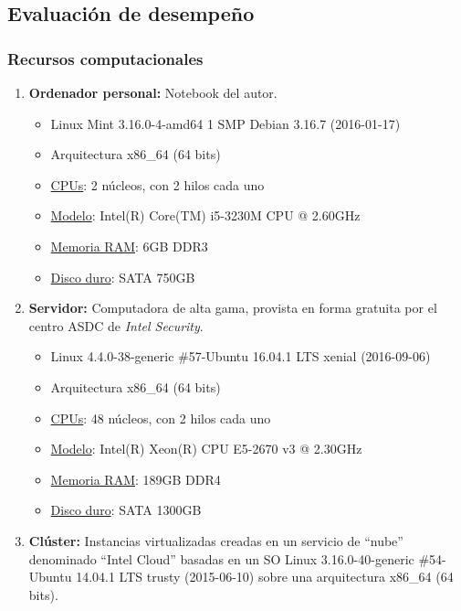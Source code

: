 \subsection{Evaluación de desempeño}
\begin{frame}[t,fragile]
	\frametitle {Recursos computacionales}

	
	\begin{enumerate}
		\item<1|only@1> \textbf{Ordenador personal:} Notebook del autor.
		
		\begin{itemize}
			\item Linux Mint 3.16.0-4-amd64 1 SMP Debian 3.16.7 (2016-01-17)
			\item Arquitectura x86\_64 (64 bits)
			\item \underline{CPUs}: 2 núcleos, con 2 hilos cada uno
			\item \underline{Modelo}: Intel(R) Core(TM) i5-3230M CPU @ 2.60GHz
			\item \underline{Memoria RAM}: 6GB DDR3
			\item \underline{Disco duro}: SATA 750GB %
		\end{itemize}
		
		\item<2|only@2> \textbf{Servidor:} Computadora de alta gama, provista en forma gratuita por el centro ASDC de \textit{Intel Security}.
		
		\begin{itemize}
			\item Linux 4.4.0-38-generic \#57-Ubuntu 16.04.1 LTS xenial (2016-09-06)
			\item Arquitectura x86\_64 (64 bits)
			\item \underline{CPUs}: 48 núcleos, con 2 hilos cada uno
			\item \underline{Modelo}: Intel(R) Xeon(R) CPU E5-2670 v3 @ 2.30GHz
			\item \underline{Memoria RAM}: 189GB DDR4
			\item \underline{Disco duro}: SATA 1300GB
		\end{itemize}
		\pause
		
		\item<3|only@3> 
		\textbf{Clúster:} Instancias virtualizadas creadas en un servicio de ``nube'' denominado ``Intel Cloud'' basadas en un
		SO Linux 3.16.0-40-generic \#54-Ubuntu 14.04.1 LTS trusty (2015-06-10) sobre una arquitectura x86\_64 (64 bits).
		

\end{enumerate}
\end{frame}
